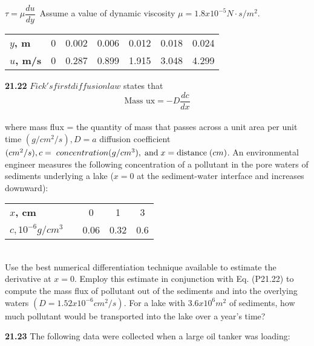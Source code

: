 \documentclass[../main.tex]{subfiles}
\begin{document}
\begin{multicols}{2}
$ \tau = \mu \dfrac{du}{dy} $\
Assume a value of dynamic viscosity $\mu = 1.8 x 10^{-5} N \cdot{} s/m^{2}$.\\
\begin{tabular}{lcccccc}
\hline

	{\textbf{$y$, m}} & {0} & {0.002} & {0.006} & {0.012} & {0.018} & {0.024}\\
	
	{\textbf{$u$, m/s}} & {0} & {0.287} & {0.899} & {1.915} & {3.048} & {4.299}\\
	
\hline
\end{tabular}

\textbf{21.22} $Fick's first diffusion law$ states that
\begin{equation}
\tag{P21.22}
\textrm{Mass ux} = -D\dfrac{dc}{dx}
\end{equation}\\
where mass flux = the quantity of mass that passes across a
unit area per unit time $(g/cm^{2}/s), D=a$ diffusion coefficient $(cm^{2}/s), c = \textrm \; {concentration} (g/cm^{3}), \; \textrm{and} \; x = \textrm{distance} \; (cm)$. An environmental engineer measures the following concentration of a pollutant in the pore waters of sediments underlying a lake ($x = 0$ at the sediment-water interface and
increases downward): \\
\begin{tabular}{lcccc}
\hline

	\textbf{$x$, cm} & \vspace{0,1in} & 0 & 1 & 3\\
	
	\textbf{$c, 10^{-6} g/cm^{3}$} & \vspace{0,1in} & 0.06 & 0.32 & 0.6\\

\hline
\end{tabular}\\
Use the best numerical differentiation technique available to
estimate the derivative at $x = 0$. Employ this estimate in
conjunction with Eq. (P21.22) to compute the mass flux of
pollutant out of the sediments and into the overlying waters $(D=1.52 x 10^{-6} cm^{2}/s)$. For a lake with $3.6 x 10^{6} m^{2}$ of
sediments, how much pollutant would be transported into
the lake over a year's time? 

\textbf{21.23} The following data were collected when a large oil
tanker was loading: \\
\begin{tabular}{lccccccc}
	\hline


\end{tabular}
\end{multicols}
\end{document}
